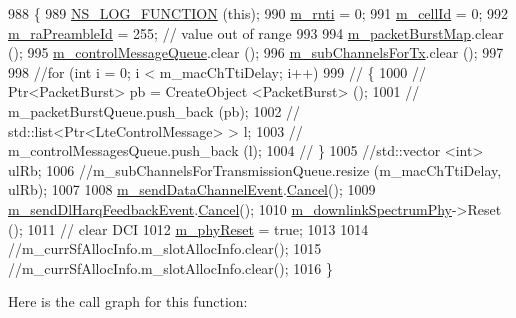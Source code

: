 \begin{DoxyCode}
988 \{
989         \hyperlink{log-macros-disabled_8h_a90b90d5bad1f39cb1b64923ea94c0761}{NS\_LOG\_FUNCTION} (\textcolor{keyword}{this});
990         \hyperlink{classns3_1_1MmWaveUePhy_aae63c66b69de47ac19b4033ecf4bc211}{m\_rnti} = 0;
991         \hyperlink{classns3_1_1MmWavePhy_a0594531da45f93220d4f5de292bae823}{m\_cellId} = 0;
992         \hyperlink{classns3_1_1MmWavePhy_a671378769e45c75b0ad2fc95299af6ec}{m\_raPreambleId} = 255; \textcolor{comment}{// value out of range}
993 
994         \hyperlink{classns3_1_1MmWavePhy_af741671ef4e7da55b53c69efe7375ab6}{m\_packetBurstMap}.clear ();
995         \hyperlink{classns3_1_1MmWavePhy_ab8d262ef427a0c22ebb614f9991e7ce0}{m\_controlMessageQueue}.clear ();
996         \hyperlink{classns3_1_1MmWaveUePhy_ae8c5b752db04a74c6749cc2bd702a99a}{m\_subChannelsForTx}.clear ();
997 
998         \textcolor{comment}{//for (int i = 0; i < m\_macChTtiDelay; i++)}
999         \textcolor{comment}{//  \{}
1000         \textcolor{comment}{//    Ptr<PacketBurst> pb = CreateObject <PacketBurst> ();}
1001         \textcolor{comment}{//    m\_packetBurstQueue.push\_back (pb);}
1002         \textcolor{comment}{//    std::list<Ptr<LteControlMessage> > l;}
1003         \textcolor{comment}{//    m\_controlMessagesQueue.push\_back (l);}
1004         \textcolor{comment}{//  \}}
1005         \textcolor{comment}{//std::vector <int> ulRb;}
1006         \textcolor{comment}{//m\_subChannelsForTransmissionQueue.resize (m\_macChTtiDelay, ulRb);}
1007 
1008         \hyperlink{classns3_1_1MmWaveUePhy_a2a99096220cec900c61b24052a0c37b7}{m\_sendDataChannelEvent}.\hyperlink{classns3_1_1EventId_a993ae94e48e014e1afd47edb16db7a11}{Cancel}();
1009         \hyperlink{classns3_1_1MmWaveUePhy_accf11cb68767e6baae1b4c54f6d5fb45}{m\_sendDlHarqFeedbackEvent}.\hyperlink{classns3_1_1EventId_a993ae94e48e014e1afd47edb16db7a11}{Cancel}();
1010         \hyperlink{classns3_1_1MmWavePhy_aa266d9d20ba903f9adf2695dd626b885}{m\_downlinkSpectrumPhy}->Reset ();
1011         \textcolor{comment}{// clear DCI }
1012         \hyperlink{classns3_1_1MmWaveUePhy_a64e6caf030c2a285fd561cf5e28f309d}{m\_phyReset} = \textcolor{keyword}{true};
1013 
1014         \textcolor{comment}{//m\_currSfAllocInfo.m\_slotAllocInfo.clear();}
1015         \textcolor{comment}{//m\_currSfAllocInfo.m\_slotAllocInfo.clear();}
1016 \}
\end{DoxyCode}


Here is the call graph for this function\+:


